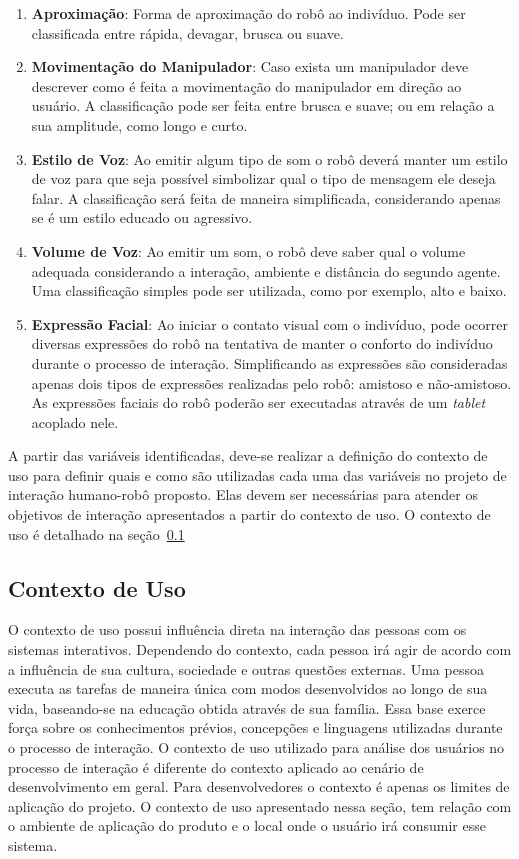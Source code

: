 \begin{enumerate}
    \item \textbf{Aproximação}: Forma de aproximação do robô ao indivíduo. Pode ser classificada entre rápida, devagar, brusca ou suave.
    \item \textbf{Movimentação do Manipulador}: Caso exista um manipulador deve descrever como é feita a movimentação do manipulador em direção ao usuário. A classificação pode ser feita entre brusca e suave; ou em relação a sua amplitude, como longo e curto.
    \item \textbf{Estilo de Voz}: Ao emitir algum tipo de som o robô deverá manter um estilo de voz para que seja possível simbolizar qual o tipo de mensagem ele deseja falar. A classificação será feita de maneira simplificada, considerando apenas se é um estilo educado ou agressivo.
    \item \textbf{Volume de Voz}: Ao emitir um som, o robô deve saber qual o volume adequada considerando a interação, ambiente e distância do segundo agente. Uma classificação simples pode ser utilizada, como por exemplo, alto e baixo.
    \item \textbf{Expressão Facial}: Ao iniciar o contato visual com o indivíduo, pode ocorrer diversas expressões do robô na tentativa de manter o conforto do indivíduo durante o processo de interação. Simplificando as expressões são consideradas apenas dois tipos de expressões realizadas pelo robô: amistoso e não-amistoso. As expressões faciais do robô poderão ser executadas através de um \emph{tablet} acoplado nele.
\end{enumerate}

A partir das variáveis identificadas, deve-se realizar a definição do contexto de uso para definir quais e como são utilizadas cada uma das variáveis no projeto de interação humano-robô proposto. Elas devem ser necessárias para atender os objetivos de interação apresentados a partir do contexto de uso. O contexto de uso é detalhado na seção~\ref{sec:contextouso}

\subsection{Contexto de Uso}
\label{sec:contextouso}
O contexto de uso possui influência direta na interação das pessoas com os sistemas interativos. Dependendo do contexto, cada pessoa irá agir de acordo com a influência de sua cultura, sociedade e outras questões externas. Uma pessoa executa as tarefas de maneira única com modos desenvolvidos ao longo de sua vida, baseando-se na educação obtida através de sua família. Essa base exerce força sobre os conhecimentos prévios, concepções e linguagens utilizadas durante o processo de interação. O contexto de uso utilizado para análise dos usuários no processo de interação é diferente do contexto aplicado ao cenário de desenvolvimento em geral. Para desenvolvedores o contexto é apenas os limites de aplicação do projeto. O contexto de uso apresentado nessa seção, tem relação com o ambiente de aplicação do produto e o local onde o usuário irá consumir esse sistema.

